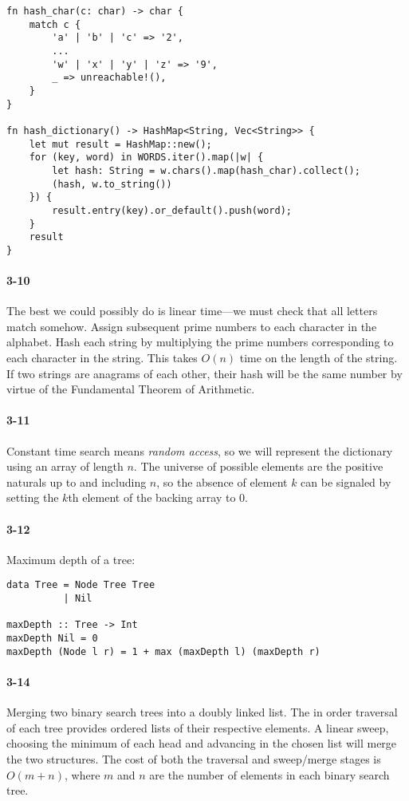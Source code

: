 \documentclass{report}
\begin{document}
\begin{lstlisting}
fn hash_char(c: char) -> char {
    match c {
        'a' | 'b' | 'c' => '2',
        ...
        'w' | 'x' | 'y' | 'z' => '9',
        _ => unreachable!(),
    }
}

fn hash_dictionary() -> HashMap<String, Vec<String>> {
    let mut result = HashMap::new();
    for (key, word) in WORDS.iter().map(|w| {
        let hash: String = w.chars().map(hash_char).collect();
        (hash, w.to_string())
    }) {
        result.entry(key).or_default().push(word);
    }
    result
}
\end{lstlisting}

\paragraph{3-10} The best we could possibly do is linear time---we must check that all letters match somehow. Assign subsequent prime numbers to each character in the alphabet. Hash each string by multiplying the prime numbers corresponding to each character in the string. This takes $O(n)$ time on the length of the string. If two strings are anagrams of each other, their hash will be the same number by virtue of the Fundamental Theorem of Arithmetic.

\paragraph{3-11} Constant time search means \emph{random access}, so we will represent the dictionary using an array of length $n$. The universe of possible elements are the positive naturals up to and including $n$, so the absence of element $k$ can be signaled by setting the $k$th element of the backing array to 0.

\paragraph{3-12} Maximum depth of a tree:
\begin{lstlisting}
data Tree = Node Tree Tree
          | Nil

maxDepth :: Tree -> Int
maxDepth Nil = 0
maxDepth (Node l r) = 1 + max (maxDepth l) (maxDepth r)
\end{lstlisting}

\paragraph{3-14} Merging two binary search trees into a doubly linked list. The in order traversal of each tree provides ordered lists of their respective elements. A linear sweep, choosing the minimum of each head and advancing in the chosen list will merge the two structures. The cost of both the traversal and sweep/merge stages is $O(m+n)$, where $m$ and $n$ are the number of elements in each binary search tree.
\end{document}
